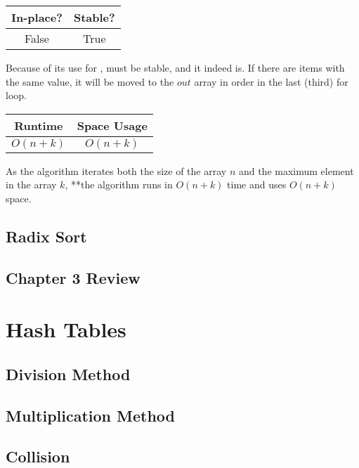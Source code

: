 \documentclass{report}
\begin{document}
\begin{center}
  \begin{tabular}{ | c | c | }
    \hline
    In-place? & Stable? \\
    \hline
    False & True \\
    \hline
  \end{tabular}
\end{center}

Because of its use for ,  must be stable, and it indeed is. If there are items with the same value, it will be moved to the $out$ array in order in the last (third) for loop.

\begin{center}
  \begin{tabular}{ | c | c | }
    \hline
    Runtime & Space Usage \\
    \hline
    $O(n + k)$ & $O(n + k)$ \\
    \hline
  \end{tabular}
\end{center}

As the algorithm iterates both the size of the array $n$ and the maximum element in the array $k$, **the algorithm runs in $O(n + k)$ time and uses $O(n + k)$ space.

\section{Radix Sort}

\section{Chapter 3 Review}


\chapter{Hash Tables}

\section{Division Method}

\section{Multiplication Method}

\section{Collision}
\end{document}
